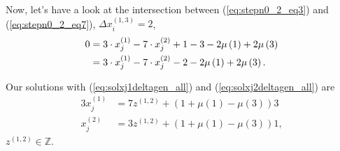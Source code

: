 Now, let's have a look at the intersection between (\ref{eq:stepn0_2_eq3}) and (\ref{eq:stepn0_2_eq7}), $\Delta x_{i}^{\left(1,3\right)} = 2$,
\begin{alignat}{3}
	0 &= 3\cdot x_{j}^{\left(1\right)} - 7\cdot x_{j}^{\left(2\right)} + 1 - 3 - 2\mu\left(1\right)  + 2\mu\left(3\right) \notag \\
	  &= 3\cdot x_{j}^{\left(1\right)} - 7\cdot x_{j}^{\left(2\right)} - 2 - 2\mu\left(1\right)  + 2\mu\left(3\right). \label{eq:step0_2_int37}
\end{alignat}

Our solutions with (\ref{eq:solxj1deltagen_all}) and (\ref{eq:solxj2deltagen_all}) are
\begin{alignat}{3}
	x_{j}^{\left(1\right)} &= 7z^{\left(1,2\right)} + \left(1 + \mu\left(1\right) - \mu\left(3\right)\right)3 \label{eq:step0_2_sol35_1} \\
	x_{j}^{\left(2\right)} &= 3z^{\left(1,2\right)} + \left(1 + \mu\left(1\right) - \mu\left(3\right)\right)1 \label{eq:step0_2_sol35_2},
\end{alignat}
$z^{\left(1,2\right)} \in \mathbb{Z}$.\\















